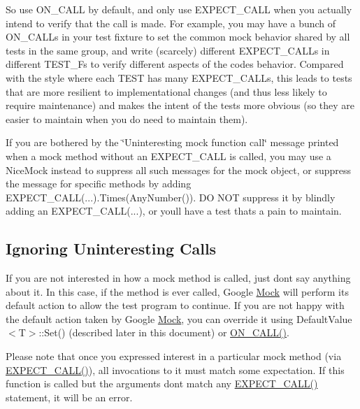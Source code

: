 So use {\ttfamily O\+N\+\_\+\+C\+A\+LL} by default, and only use {\ttfamily E\+X\+P\+E\+C\+T\+\_\+\+C\+A\+LL} when you actually intend to verify that the call is made. For example, you may have a bunch of {\ttfamily O\+N\+\_\+\+C\+A\+LL}s in your test fixture to set the common mock behavior shared by all tests in the same group, and write (scarcely) different {\ttfamily E\+X\+P\+E\+C\+T\+\_\+\+C\+A\+LL}s in different {\ttfamily T\+E\+S\+T\+\_\+F}s to verify different aspects of the code\textquotesingle{}s behavior. Compared with the style where each {\ttfamily T\+E\+ST} has many {\ttfamily E\+X\+P\+E\+C\+T\+\_\+\+C\+A\+LL}s, this leads to tests that are more resilient to implementational changes (and thus less likely to require maintenance) and makes the intent of the tests more obvious (so they are easier to maintain when you do need to maintain them).

If you are bothered by the \char`\"{}\+Uninteresting mock function call\char`\"{} message printed when a mock method without an {\ttfamily E\+X\+P\+E\+C\+T\+\_\+\+C\+A\+LL} is called, you may use a {\ttfamily Nice\+Mock} instead to suppress all such messages for the mock object, or suppress the message for specific methods by adding {\ttfamily E\+X\+P\+E\+C\+T\+\_\+\+C\+A\+LL(...).Times(\+Any\+Number())}. DO N\+OT suppress it by blindly adding an {\ttfamily E\+X\+P\+E\+C\+T\+\_\+\+C\+A\+LL(...)}, or you\textquotesingle{}ll have a test that\textquotesingle{}s a pain to maintain.

\subsection*{Ignoring Uninteresting Calls}

If you are not interested in how a mock method is called, just don\textquotesingle{}t say anything about it. In this case, if the method is ever called, Google \hyperlink{class_mock}{Mock} will perform its default action to allow the test program to continue. If you are not happy with the default action taken by Google \hyperlink{class_mock}{Mock}, you can override it using {\ttfamily Default\+Value$<$T$>$\+::\+Set()} (described later in this document) or {\ttfamily \hyperlink{gmock-spec-builders_8h_a5b12ae6cf84f0a544ca811b380c37334}{O\+N\+\_\+\+C\+A\+L\+L()}}.

Please note that once you expressed interest in a particular mock method (via {\ttfamily \hyperlink{gmock-spec-builders_8h_a535a6156de72c1a2e25a127e38ee5232}{E\+X\+P\+E\+C\+T\+\_\+\+C\+A\+L\+L()}}), all invocations to it must match some expectation. If this function is called but the arguments don\textquotesingle{}t match any {\ttfamily \hyperlink{gmock-spec-builders_8h_a535a6156de72c1a2e25a127e38ee5232}{E\+X\+P\+E\+C\+T\+\_\+\+C\+A\+L\+L()}} statement, it will be an error.

